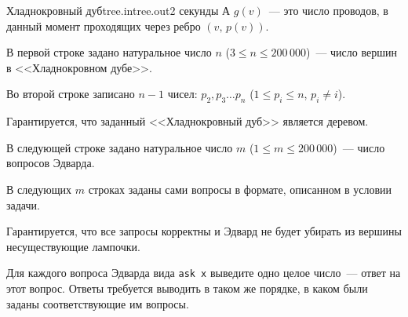 \begin{problem}{Хладнокровный дуб}{tree.in}{tree.out}{2 секунды}{}
А $g(v)$~--- это число проводов, в данный момент проходящих через ребро $(v,\,p(v))$.

\InputFile
В первой строке задано натуральное число $n$ ($3 \le n \le 200\,000$)~--- число вершин в <<Хладнокровном дубе>>.

Во второй строке записано $n - 1$ чисел: $p_2, p_3 \ldots p_n$ ($1 \le p_i \le n$, $p_i \ne i$).

Гарантируется, что заданный <<Хладнокровный дуб>> является деревом.

В следующей строке задано натуральное число $m$ ($1 \le m \le 200\,000$)~--- число вопросов Эдварда.

В следующих $m$ строках заданы сами вопросы в формате, описанном в условии задачи.

Гарантируется, что все запросы корректны и Эдвард не будет убирать из вершины несуществующие лампочки.

\OutputFile

Для каждого вопроса Эдварда вида \texttt{ask x} выведите одно целое число~--- ответ на этот вопрос. 
Ответы требуется выводить в таком же порядке, в каком были заданы соответствующие им вопросы.

\Examples
\begin{example}%
%
%
\end{example}


\end{problem}
